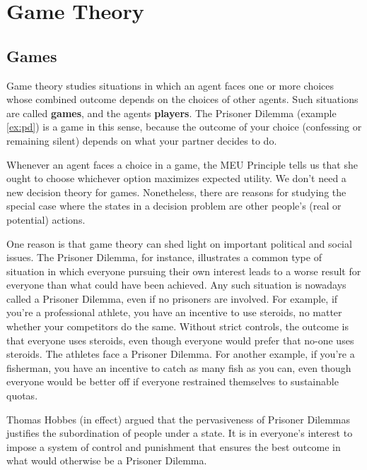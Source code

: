 \chapter{Game Theory}\label{ch:gametheory}

\section{Games}\label{sec:games}

Game theory studies situations in which an agent faces one or more
choices whose combined outcome depends on the choices of other
agents. Such situations are called \textbf{games}, and the agents
\textbf{players}. The Prisoner Dilemma (example \ref{ex:pd}) is a game in this sense,
because the outcome of your choice (confessing or remaining silent)
depends on what your partner decides to do.

Whenever an agent faces a choice in a game, the MEU Principle tells us
that she ought to choose whichever option maximizes expected
utility. We don't need a new decision theory for
games. Nonetheless, there are reasons for studying the special case
where the states in a decision problem are other people's (real or
potential) actions.

One reason is that game theory can shed light on important political
and social issues. The Prisoner Dilemma, for instance, illustrates a
common type of situation in which everyone pursuing their own interest
leads to a worse result for everyone than what could have been
achieved. Any such situation is nowadays called a Prisoner Dilemma,
even if no prisoners are involved. For example, if you're a
professional athlete, you have an incentive to use steroids, no matter
whether your competitors do the same. Without strict controls, the
outcome is that everyone uses steroids, even though everyone would
prefer that no-one uses steroids. The athletes face a Prisoner
Dilemma. For another example, if you're a fisherman, you have an
incentive to catch as many fish as you can, even though everyone would
be better off if everyone restrained themselves to sustainable quotas.

Thomas Hobbes (in effect) argued that the pervasiveness of Prisoner
Dilemmas justifies the subordination of people under a state. It is in
everyone's interest to impose a system of control and punishment that
ensures the best outcome in what would otherwise be a Prisoner
Dilemma.


